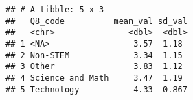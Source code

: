 \documentclass[]{article}
\newenvironment{Shaded}{\begin{snugshade}}{\end{snugshade}}
\newcommand{\KeywordTok}[1]{\textcolor[rgb]{0.13,0.29,0.53}{\textbf{#1}}}
\newcommand{\DataTypeTok}[1]{\textcolor[rgb]{0.13,0.29,0.53}{#1}}
\newcommand{\StringTok}[1]{\textcolor[rgb]{0.31,0.60,0.02}{#1}}
\newcommand{\OtherTok}[1]{\textcolor[rgb]{0.56,0.35,0.01}{#1}}
\newcommand{\OperatorTok}[1]{\textcolor[rgb]{0.81,0.36,0.00}{\textbf{#1}}}
\newcommand{\NormalTok}[1]{#1}
\begin{document}
\begin{Shaded}
\end{Shaded}

\begin{verbatim}
## # A tibble: 5 x 3
##   Q8_code          mean_val sd_val
##   <chr>               <dbl>  <dbl>
## 1 <NA>                 3.57  1.18 
## 2 Non-STEM             3.34  1.15 
## 3 Other                3.83  1.12 
## 4 Science and Math     3.47  1.19 
## 5 Technology           4.33  0.867
\end{verbatim}
\end{document}
